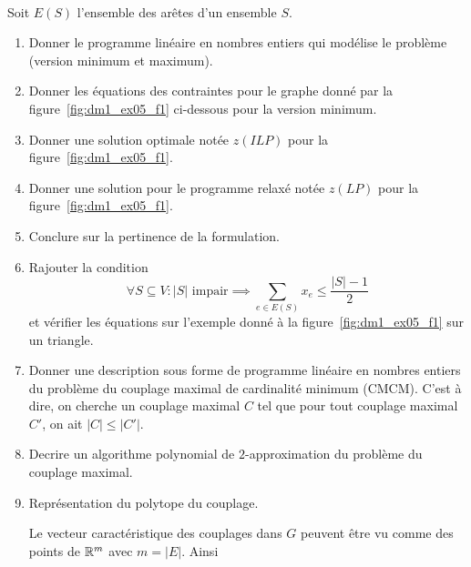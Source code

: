 \begin{td-exo}\,\\ %
	Soit \(E(S)\) l'ensemble des arêtes d'un ensemble \(S\).

	\begin{enumerate}
		\item Donner le programme linéaire en nombres entiers qui modélise le problème (version minimum et maximum).

		\item Donner les équations des contraintes pour le graphe donné par la figure~\ref{fig:dm1_ex05_f1} ci-dessous pour la version minimum.

		

		\item Donner une solution optimale notée \(z(ILP)\) pour la figure~\ref{fig:dm1_ex05_f1}.

		\item Donner une solution pour le programme relaxé notée \(z(LP)\) pour la figure~\ref{fig:dm1_ex05_f1}.

		\item Conclure sur la pertinence de la formulation.

		\item Rajouter la condition 
		\begin{equation*}
			\forall S \subseteq V: |S| \text{ impair} \implies \sum_{e \in E(S)} x_e \leq \frac{|S|-1}{2}
		\end{equation*}
		et vérifier les équations sur l'exemple donné à la figure~\ref{fig:dm1_ex05_f1} sur un triangle.

		\item Donner une description sous forme de programme linéaire en nombres entiers du problème du couplage maximal de cardinalité minimum (CMCM). C'est à dire, on cherche un couplage maximal \(C\) tel que pour tout couplage maximal \(C'\), on ait \(|C| \leq |C'|\).

		\item Decrire un algorithme polynomial de \(2\)-approximation du problème du couplage maximal.

		\item Représentation du polytope du couplage. 
		
		Le vecteur caractéristique des couplages dans \(G\) peuvent être vu comme des points de \(\mathbb{R}^m\) avec \(m = |E|\). 
		Ainsi


\end{enumerate}
\end{td-exo}
